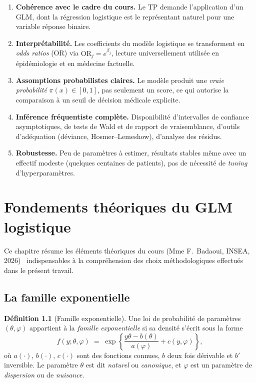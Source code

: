 \documentclass[11pt,a4paper,twoside]{report}
\newcommand{\OR}{\mathrm{OR}}
\theoremstyle{definition}
\newtheorem{definition}{Définition}[chapter]
\begin{document}
\begin{enumerate}
  \item \textbf{Cohérence avec le cadre du cours.} Le TP demande
    l'application d'un GLM, dont la régression logistique est le
    représentant naturel pour une variable réponse binaire.

  \item \textbf{Interprétabilité.} Les coefficients du modèle
    logistique se transforment en \emph{odds ratios} (OR) via
    $\OR_j = e^{\beta_j}$, lecture universellement utilisée en
    épidémiologie et en médecine factuelle.

  \item \textbf{Assomptions probabilistes claires.} Le modèle produit
    une \emph{vraie probabilité} $\pi(x) \in [0,1]$, pas seulement un
    score, ce qui autorise la comparaison à un seuil de décision
    médicale explicite.

  \item \textbf{Inférence fréquentiste complète.} Disponibilité
    d'intervalles de confiance asymptotiques, de tests de Wald et de
    rapport de vraisemblance, d'outils d'adéquation (déviance,
    Hosmer--Lemeshow), d'analyse des résidus.

  \item \textbf{Robustesse.} Peu de paramètres à estimer, résultats
    stables même avec un effectif modeste (quelques centaines de
    patients), pas de nécessité de \emph{tuning} d'hyperparamètres.
\end{enumerate}

\chapter{Fondements théoriques du GLM logistique}

Ce chapitre résume les éléments théoriques du cours
(Mme F.\ Badaoui, INSEA, 2026)~\cite{cours} indispensables à la
compréhension des choix méthodologiques effectués dans le présent
travail.

\section{La famille exponentielle}

\begin{definition}[Famille exponentielle]
Une loi de probabilité de paramètres $(\theta,\varphi)$ appartient à la
\emph{famille exponentielle} si sa densité s'écrit sous la forme
\begin{equation}
  f(y;\theta,\varphi) \;=\; \exp\!\left\{
    \frac{y\theta - b(\theta)}{a(\varphi)}
    + c(y,\varphi) \right\},
  \label{eq:expfam}
\end{equation}
où $a(\cdot)$, $b(\cdot)$, $c(\cdot)$ sont des fonctions connues, $b$
deux fois dérivable et $b'$ inversible. Le paramètre $\theta$ est dit
\emph{naturel} ou \emph{canonique}, et $\varphi$ est un paramètre de
\emph{dispersion} ou de \emph{nuisance}.
\end{definition}
\end{document}
